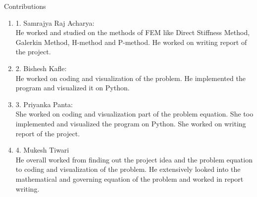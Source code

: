 
	Contributions \\
	\begin{enumerate}
		\item 	1. Samrajya Raj Acharya:\\
		 He worked and studied on the methods of FEM like Direct Stiffness Method, Galerkin Method, H-method and P-method. He worked on writing report of the project.\\
		 \item  2. Bishesh Kafle:\\
		 He worked on coding and visualization of the problem. He implemented the program and visualized it on Python.\\
		 \item 3. Priyanka Panta:\\
		 She worked on coding and visualization part of the problem equation. She too implemented and visualized the program on Python. She worked on writing report of the project. \\
		 \item 4. Mukesh Tiwari\\
		 He overall worked from finding out the project idea and the problem equation to coding and visualization of the problem. He extensively looked into the mathematical and governing equation of the problem and worked in report writing.
	\end{enumerate}
